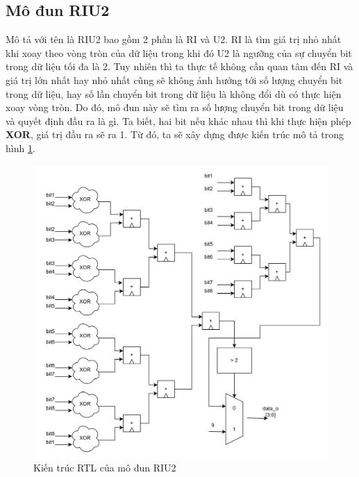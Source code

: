 \subsection{Mô đun RIU2}
Mô tả với tên là RIU2 bao gồm 2 phần là RI và U2. RI là tìm giá trị nhỏ nhất khi xoay theo vòng tròn của dữ liệu trong khi đó U2 là ngưỡng của sự chuyển bit trong dữ liệu tối đa là 2. Tuy nhiên thì ta thực tế không cần quan tâm đến RI và giá trị lớn nhất hay nhỏ nhất cũng sẽ không ảnh hưởng tới số lượng chuyển bit trong dữ liệu, hay số lần chuyển bit trong dữ liệu là không đổi dù có thực hiện xoay vòng tròn. Do đó, mô đun này sẽ tìm ra số lượng chuyển bit trong dữ liệu và quyết định đầu ra là gì. Ta biết, hai bit nếu khác nhau thì khi thực hiện phép \textbf{XOR}, giá trị đầu ra sẽ ra 1. Từ đó, ta sẽ xây dựng được kiến trúc mô tả trong hình \ref{fig:riu2RTL}.
\begin{figure}[!ht]
	\centering
	\includegraphics[width=\linewidth]{figures/riu2RTL.png}
	\caption{Kiến trúc RTL của mô đun RIU2}
	\label{fig:riu2RTL}
\end{figure}

